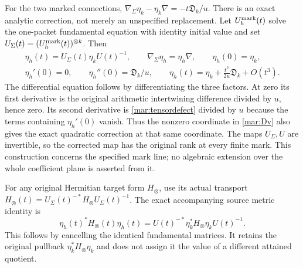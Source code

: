 \documentclass[11pt]{article}
\begin{document}
For the two marked connections,
$\nabla_\Sigma\eta_k-\eta_k\nabla=-t\mathfrak D_k/u$.
There is an exact analytic correction, not merely an unspecified
replacement. Let $U_h^{\rm mark}(t)$ solve the one-packet
fundamental equation with identity initial value and set
$U_\Sigma(t)=(U_h^{\rm mark}(t))^{\otimes k}$.
Then
\begin{equation}\tag{MAR25}\label{mar:eta-horizontal}
 \begin{gathered}
 \eta_h(t)=U_\Sigma(t)\eta_k U(t)^{-1},\qquad
 \nabla_\Sigma\eta_h=\eta_h\nabla,\qquad\eta_h(0)=\eta_k,\\
 \eta_h'(0)=0,\qquad\eta_h''(0)=\mathfrak D_k/u,
 \qquad\eta_h(t)=\eta_k+\frac{t^2}{2u}\mathfrak D_k+O(t^3).
 \end{gathered}
\end{equation}
The differential equation follows by differentiating the three
factors. At zero its first derivative is the original arithmetic
intertwining difference divided by $u$, hence zero. Its second
derivative is \eqref{mar:tensordefect} divided by $u$ because
the terms containing $\eta_h'(0)$ vanish. Thus the nonzero
coordinate in \eqref{mar:Dv} also gives the exact quadratic
correction at that same coordinate. The maps $U_\Sigma,U$ are
invertible, so the corrected map has the original rank at every
finite mark. This construction concerns the specified mark line;
no algebraic extension over the whole coefficient plane is
asserted from it.

For any original Hermitian target form $H_\otimes$, use its actual
transport $H_\otimes(t)=U_\Sigma(t)^{-*}H_\otimes U_\Sigma(t)^{-1}$.
The exact accompanying source metric identity is
\begin{equation}\tag{MAR26}\label{mar:tensormetric}
 \eta_h(t)^*H_\otimes(t)\eta_h(t)
    =U(t)^{-*}\eta_k^*H_\otimes\eta_k U(t)^{-1}.
\end{equation}
This follows by cancelling the identical fundamental matrices.
It retains the original pullback $\eta_k^*H_\otimes\eta_k$ and
does not assign it the value of a different attained quotient.
\end{document}
